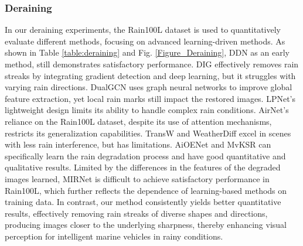 \documentclass[final,12pt]{elsarticle}
\begin{document}
\subsubsection{Deraining}
%
    In our deraining experiments, the Rain100L dataset is used to quantitatively evaluate different methods, focusing on advanced learning-driven methods. As shown in Table \ref{table:deraining} and Fig. \ref{Figure_Deraining}, DDN as an early method, still demonstrates satisfactory performance. DIG effectively removes rain streaks by integrating gradient detection and deep learning, but it struggles with varying rain directions. DualGCN uses graph neural networks to improve global feature extraction, yet local rain marks still impact the restored images. LPNet's lightweight design limits its ability to handle complex rain conditions. AirNet's reliance on the Rain100L dataset, despite its use of attention mechanisms, restricts its generalization capabilities. TransW and WeatherDiff excel in scenes with less rain interference, but has limitations. AiOENet and MvKSR can specifically learn the rain degradation process and have good quantitative and qualitative results. Limited by the differences in the features of the degraded images learned, MIRNet is difficult to achieve satisfactory performance in Rain100L, which further reflects the dependence of learning-based methods on training data. In contrast, our method consistently yields better quantitative results, effectively removing rain streaks of diverse shapes and directions, producing images closer to the underlying sharpness, thereby enhancing visual perception for intelligent marine vehicles in rainy conditions.
%
    \setlength{\tabcolsep}{0.50pt}
\end{document}
